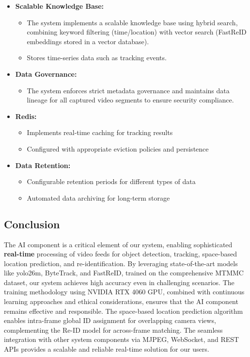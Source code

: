 \begin{itemize}
    \item \textbf{Scalable Knowledge Base:} 
    \begin{itemize}
        \item The system implements a scalable knowledge base using hybrid search, combining keyword filtering (time/location) with vector search (FastReID embeddings stored in a vector database).
        \item Stores time-series data such as tracking events.
    \end{itemize}
    \item \textbf{Data Governance:}
    \begin{itemize}
        \item The system enforces strict metadata governance and maintains data lineage for all captured video segments to ensure security compliance.
    \end{itemize}
    \item \textbf{Redis:} 
    \begin{itemize}
        \item Implements real-time caching for tracking results
        \item Configured with appropriate eviction policies and persistence
    \end{itemize}
    \item \textbf{Data Retention:} 
    \begin{itemize}
        \item Configurable retention periods for different types of data
        \item Automated data archiving for long-term storage
    \end{itemize}
\end{itemize}

\subsection{Conclusion}
\label{subsection:conclusion}

The AI component is a critical element of our system, enabling sophisticated \textbf{real-time} processing of video feeds for object detection, tracking, space-based location prediction, and re-identification. By leveraging state-of-the-art models like yolo26m, ByteTrack, and FastReID, trained on the comprehensive MTMMC dataset, our system achieves high accuracy even in challenging scenarios. The training methodology using NVIDIA RTX 4060 GPU, combined with continuous learning approaches and ethical considerations, ensures that the AI component remains effective and responsible. The space-based location prediction algorithm enables intra-frame global ID assignment for overlapping camera views, complementing the Re-ID model for across-frame matching. The seamless integration with other system components via MJPEG, WebSocket, and REST APIs provides a scalable and reliable real-time solution for our users.